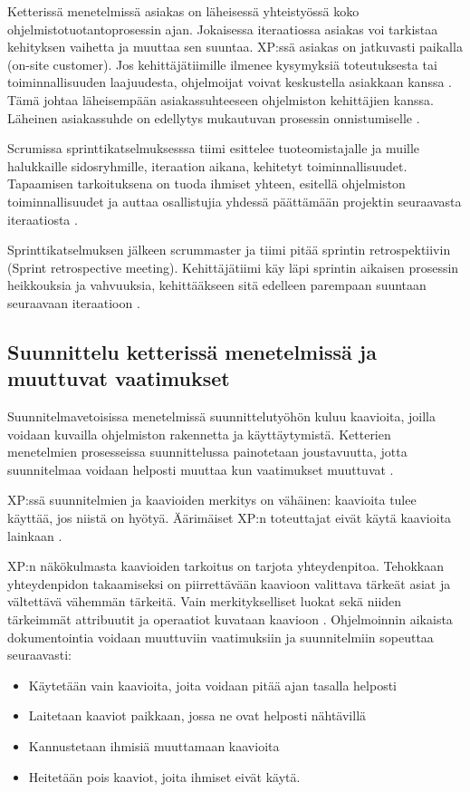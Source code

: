 \documentclass[finnish]{tktltiki2}
\theoremstyle{definition}
\theoremstyle{remark}
\begin{document}
{Ketterissä menetelmissä asiakas on läheisessä yhteistyössä koko ohjelmistotuotantoprosessin ajan. Jokaisessa iteraatiossa asiakas voi tarkistaa kehityksen vaihetta ja muuttaa sen suuntaa. XP:ssä asiakas on jatkuvasti paikalla (on-site customer). Jos kehittäjätiimille ilmenee kysymyksiä toteutuksesta tai toiminnallisuuden laajuudesta, ohjelmoijat voivat keskustella asiakkaan kanssa \cite{BEC99}. Tämä johtaa läheisempään asiakassuhteeseen ohjelmiston kehittäjien kanssa. Läheinen asiakassuhde on edellytys mukautuvan prosessin onnistumiselle \cite{FOW01a}.

Scrumissa sprinttikatselmuksesssa tiimi esittelee tuoteomistajalle ja muille halukkaille sidosryhmille, iteraation aikana, kehitetyt toiminnallisuudet. Tapaamisen tarkoituksena on tuoda ihmiset yhteen, esitellä ohjelmiston toiminnallisuudet ja auttaa osallistujia yhdessä päättämään projektin seuraavasta iteraatiosta \cite{SCH09}.

Sprinttikatselmuksen jälkeen scrummaster ja tiimi pitää sprintin retrospektiivin (Sprint retrospective meeting). Kehittäjätiimi käy läpi sprintin aikaisen prosessin heikkouksia ja vahvuuksia, kehittääkseen sitä edelleen parempaan suuntaan seuraavaan iteraatioon \cite{SCH09}.


\subsection{Suunnittelu ketterissä menetelmissä ja muuttuvat vaatimukset}

Suunnitelmavetoisissa menetelmissä suunnittelutyöhön kuluu kaavioita, joilla voidaan kuvailla ohjelmiston rakennetta ja käyttäytymistä. Ketterien menetelmien prosesseissa suunnittelussa painotetaan joustavuutta, jotta suunnitelmaa voidaan helposti muuttaa kun vaatimukset muuttuvat \cite{FOW01b}.

XP:ssä suunnitelmien ja kaavioiden merkitys on vähäinen: kaavioita tulee käyttää, jos niistä on hyötyä. Äärimäiset XP:n toteuttajat eivät käytä kaavioita lainkaan \cite{FOW01b}.

XP:n näkökulmasta kaavioiden tarkoitus on tarjota yhteydenpitoa. Tehokkaan yhteydenpidon takaamiseksi on piirrettävään kaavioon valittava tärkeät asiat ja vältettävä vähemmän tärkeitä. Vain merkitykselliset luokat sekä niiden tärkeimmät attribuutit ja operaatiot kuvataan kaavioon \cite{FOW01b}.
Ohjelmoinnin aikaista dokumentointia voidaan muuttuviin vaatimuksiin ja suunnitelmiin sopeuttaa seuraavasti: \cite{FOW01b}

\begin{itemize}
\item Käytetään vain kaavioita, joita voidaan pitää ajan tasalla helposti
\item Laitetaan kaaviot paikkaan, jossa ne ovat helposti nähtävillä
\item Kannustetaan ihmisiä muuttamaan kaavioita
\item Heitetään pois kaaviot, joita ihmiset eivät käytä.
\end{itemize}

}
\end{document}
